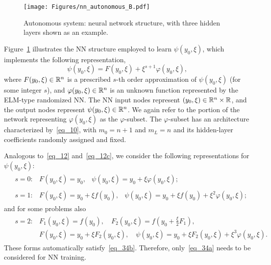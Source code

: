\begin{figure}
  \centerline{
    \texttt{[image: Figures/nn\_autonomous\_B.pdf]}
  }
  \caption{Autonomous system: neural network structure,
    with three hidden layers shown
    as an example.
  }
  \label{fg_2}
\end{figure}

Figure~\ref{fg_2} illustrates the NN structure 
employed to learn $\psi(y_0,\xi)$,
which implements the following representation,
\begin{equation}\label{eq_35}
  \psi(y_0,\xi) = F(y_0,\xi) + \xi^{s+1}\varphi(y_0,\xi),
\end{equation}
where $F(y_0,\xi)\in\mathbb{R}^n$ is a prescribed
$s$-th order approximation of $\psi(y_0,\xi)$ (for some integer $s$),
and $\varphi(y_0,\xi)\in\mathbb{R}^n$
is an unknown function represented by the ELM-type
randomized NN.
The NN input nodes  represent
$(y_0,\xi)\in\mathbb{R}^n\times\mathbb{R}$, and the output
nodes represent $\psi(y_0,\xi)\in\mathbb{R}^n$.
We again refer to the portion of the network
representing $\varphi(y_0,\xi)$ as the
$\varphi$-subset.
The $\varphi$-subset has an architecture characterized by~\eqref{eq_10},
with $m_0=n+1$ and $m_L=n$ and its hidden-layer coefficients
randomly assigned and fixed.

Analogous to~\eqref{eq_12} and~\eqref{eq_12c}, we consider the following
representations for $\psi(y_0,\xi)$:
\begin{subequations}\label{eq_36}
  \begin{align}
    & \label{eq_36a}
  \begin{array}{lll}
    s=0: & F(y_0,\xi) = y_0, & \psi(y_0,\xi) = y_0 + \xi\varphi(y_0,\xi);
  \end{array}  \\
  & \label{eq_36b}
  \begin{array}{lll}
    s=1: & F(y_0,\xi) = y_0+\xi f(y_0),
    & \psi(y_0,\xi) = y_0 + \xi f(y_0) + \xi^2\varphi(y_0,\xi);
  \end{array}
\end{align}
\end{subequations}
%
and for some problems also
\begin{align}
  & \label{eq_36c}
  \begin{array}{ll}
    s = 2: & F_1(y_0,\xi) = f(y_0), \quad F_2(y_0,\xi) = f(y_0+\frac{\xi}{2} F_1), \\
    & F(y_0,\xi) = y_0 + \xi F_2(y_0,\xi), \quad
    \psi(y_0,\xi) = y_0 + \xi F_2(y_0,\xi) + \xi^3\varphi(y_0,\xi).
  \end{array}
\end{align}
%
These forms automatically satisfy~\eqref{eq_34b}.
Therefore, only~\eqref{eq_34a} needs to be considered for NN training.

